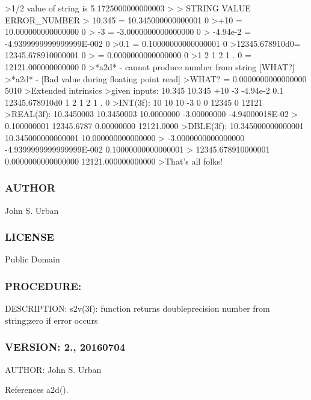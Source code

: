 \begin{DoxyVerb}
 >1/2 value of string is    5.1725000000000003
 >
 > STRING            VALUE                    ERROR_NUMBER
 > 10.345       =   10.345000000000001                0
 >+10           =   10.000000000000000                0
 >    -3        =  -3.0000000000000000                0
 >    -4.94e-2  =  -4.9399999999999999E-002           0
 >0.1           =  0.10000000000000001                0
 >12345.678910d0=   12345.678910000001                0
 >              =   0.0000000000000000                0
 >1 2 1 2 1 . 0 =   12121.000000000000                0
 >*a2d* - cannot produce number from string [WHAT?]
 >*a2d* - [Bad value during floating point read]
 >WHAT?         =   0.0000000000000000             5010
 >Extended intrinsics
 >given inputs: 10.345 10.345 +10 -3 -4.94e-2 0.1 12345.678910d0 1 2 1 2 1 . 0
 >INT(3f): 10 10 10 -3 0 0 12345 0 12121
 >REAL(3f): 10.3450003 10.3450003 10.0000000 -3.00000000 -4.94000018E-02
 >          0.100000001 12345.6787 0.00000000 12121.0000
 >DBLE(3f): 10.345000000000001 10.345000000000001 10.000000000000000
 >          -3.0000000000000000 -4.9399999999999999E-002 0.10000000000000001
 >          12345.678910000001 0.0000000000000000 12121.000000000000
 >That's all folks!
\end{DoxyVerb}
 \subsubsection*{A\+U\+T\+H\+OR}

John S. Urban \subsubsection*{L\+I\+C\+E\+N\+SE}

Public Domain \subsubsection*{P\+R\+O\+C\+E\+D\+U\+RE\+:}

D\+E\+S\+C\+R\+I\+P\+T\+I\+ON\+: s2v(3f)\+: function returns doubleprecision number from string;zero if error occurs \subsubsection*{V\+E\+R\+S\+I\+ON\+: 2., 20160704}

A\+U\+T\+H\+OR\+: John S. Urban 

References a2d().


